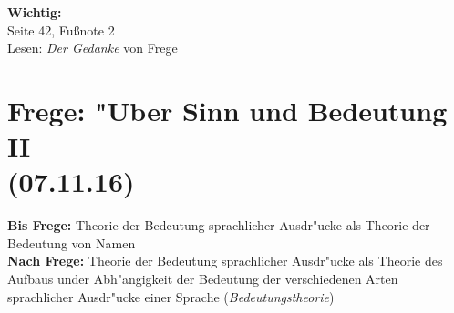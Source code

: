 \documentclass[]{scrartcl}
\begin{document}
\textbf{Wichtig:}\\Seite 42, Fu\ss note 2\\
Lesen: \emph{Der Gedanke }von Frege


\section{Frege: "Uber Sinn und Bedeutung II\\(07.11.16)}


\textbf{Bis Frege:} Theorie der Bedeutung sprachlicher Ausdr"ucke als Theorie der Bedeutung von Namen\\
\textbf{Nach Frege:} Theorie der Bedeutung sprachlicher Ausdr"ucke als Theorie des Aufbaus under Abh"angigkeit der Bedeutung der verschiedenen Arten sprachlicher Ausdr"ucke einer Sprache (\emph{Bedeutungstheorie})
\end{document}
